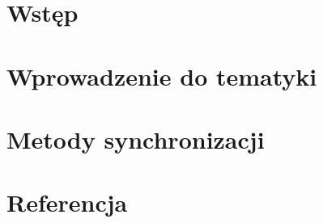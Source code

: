 \chapter{Wstęp}
\label{ch:wstep}


\chapter{Wprowadzenie do tematyki}
\label{ch:wprowadzenie_do_tematyki}


\chapter{Metody synchronizacji}
\label{ch:metody_synchronizacji}


\chapter{Referencja}
